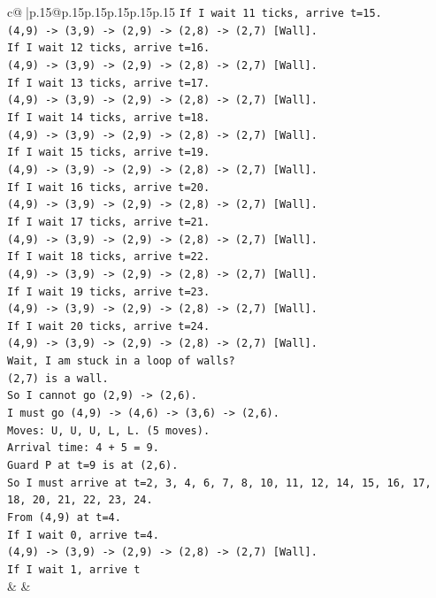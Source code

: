 \documentclass{article}
\begin{document}
{\begin{supertabular}{c@{$\;$}|p{.15\linewidth}@{}p{.15\linewidth}p{.15\linewidth}p{.15\linewidth}p{.15\linewidth}p{.15\linewidth}}
{{{\texttt{If I wait 11 ticks, arrive t=15.} \\
\texttt{(4,9) {-}> (3,9) {-}> (2,9) {-}> (2,8) {-}> (2,7) {[}Wall{]}.} \\
\texttt{If I wait 12 ticks, arrive t=16.} \\
\texttt{(4,9) {-}> (3,9) {-}> (2,9) {-}> (2,8) {-}> (2,7) {[}Wall{]}.} \\
\texttt{If I wait 13 ticks, arrive t=17.} \\
\texttt{(4,9) {-}> (3,9) {-}> (2,9) {-}> (2,8) {-}> (2,7) {[}Wall{]}.} \\
\texttt{If I wait 14 ticks, arrive t=18.} \\
\texttt{(4,9) {-}> (3,9) {-}> (2,9) {-}> (2,8) {-}> (2,7) {[}Wall{]}.} \\
\texttt{If I wait 15 ticks, arrive t=19.} \\
\texttt{(4,9) {-}> (3,9) {-}> (2,9) {-}> (2,8) {-}> (2,7) {[}Wall{]}.} \\
\texttt{If I wait 16 ticks, arrive t=20.} \\
\texttt{(4,9) {-}> (3,9) {-}> (2,9) {-}> (2,8) {-}> (2,7) {[}Wall{]}.} \\
\texttt{If I wait 17 ticks, arrive t=21.} \\
\texttt{(4,9) {-}> (3,9) {-}> (2,9) {-}> (2,8) {-}> (2,7) {[}Wall{]}.} \\
\texttt{If I wait 18 ticks, arrive t=22.} \\
\texttt{(4,9) {-}> (3,9) {-}> (2,9) {-}> (2,8) {-}> (2,7) {[}Wall{]}.} \\
\texttt{If I wait 19 ticks, arrive t=23.} \\
\texttt{(4,9) {-}> (3,9) {-}> (2,9) {-}> (2,8) {-}> (2,7) {[}Wall{]}.} \\
\texttt{If I wait 20 ticks, arrive t=24.} \\
\texttt{(4,9) {-}> (3,9) {-}> (2,9) {-}> (2,8) {-}> (2,7) {[}Wall{]}.} \\
\texttt{Wait, I am stuck in a loop of walls?} \\
\texttt{(2,7) is a wall.} \\
\texttt{So I cannot go (2,9) {-}> (2,6).} \\
\texttt{I must go (4,9) {-}> (4,6) {-}> (3,6) {-}> (2,6).} \\
\texttt{Moves: U, U, U, L, L. (5 moves).} \\
\texttt{Arrival time: 4 + 5 = 9.} \\
\texttt{Guard P at t=9 is at (2,6).} \\
\texttt{So I must arrive at t=2, 3, 4, 6, 7, 8, 10, 11, 12, 14, 15, 16, 17, 18, 20, 21, 22, 23, 24.} \\
\texttt{From (4,9) at t=4.} \\
\texttt{If I wait 0, arrive t=4.} \\
\texttt{(4,9) {-}> (3,9) {-}> (2,9) {-}> (2,8) {-}> (2,7) {[}Wall{]}.} \\
\texttt{If I wait 1, arrive t} \\
            }
        }
    }
    & & \\ \\


\end{supertabular}}
\end{document}
